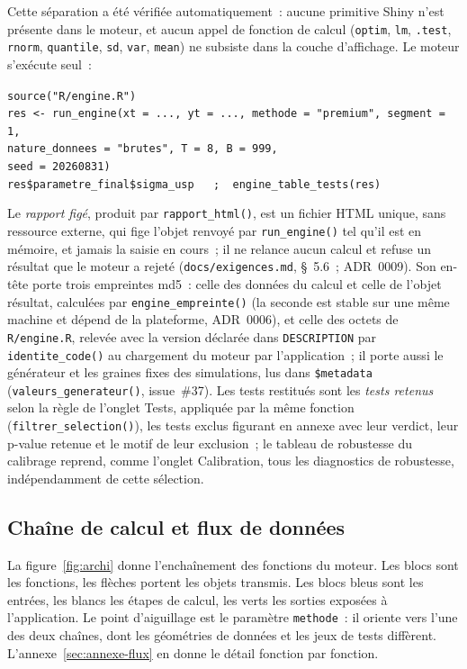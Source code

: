\documentclass[a4paper,11pt]{article}
\newcommand{\code}[1]{\texttt{\small #1}}
\begin{document}
\medskip
Cette séparation a été vérifiée automatiquement~: aucune primitive Shiny n'est
présente dans le moteur, et aucun appel de fonction de calcul
(\code{optim}, \code{lm}, \code{*.test}, \code{rnorm}, \code{quantile},
\code{sd}, \code{var}, \code{mean}) ne subsiste dans la couche d'affichage.
Le moteur s'exécute seul~:

\begin{encadre}
\small
\code{source("R/engine.R")}\\
\code{res <- run\_engine(xt = ..., yt = ..., methode = "premium", segment = 1,}\\
\code{\phantom{res <- run\_engine(}nature\_donnees = "brutes", T = 8, B = 999,}\\
\code{\phantom{res <- run\_engine(}seed = 20260831)}\\
\code{res\$parametre\_final\$sigma\_usp \ \ ;\ \ engine\_table\_tests(res)}
\end{encadre}

Le \emph{rapport figé}, produit par \code{rapport\_html()}, est un fichier HTML
unique, sans ressource externe, qui fige l'objet renvoyé par \code{run\_engine()}
tel qu'il est en mémoire, et jamais la saisie en cours~; il ne relance aucun
calcul et refuse un résultat que le moteur a rejeté (\code{docs/exigences.md},
§~5.6~; ADR~0009). Son en-tête porte trois empreintes md5~: celle des données du
calcul et celle de l'objet résultat, calculées par \code{engine\_empreinte()}
(la seconde est stable sur une même machine et dépend de la plateforme,
ADR~0006), et celle des octets de \code{R/engine.R}, relevée avec la version
déclarée dans \code{DESCRIPTION} par \code{identite\_code()} au chargement du
moteur par l'application~; il porte aussi le générateur et les graines fixes des simulations,
lus dans \code{\$metadata} (\code{valeurs\_generateur()}, issue~\#37). Les tests restitués sont les \emph{tests retenus}
selon la règle de l'onglet Tests, appliquée par la même fonction
(\code{filtrer\_selection()}), les tests exclus figurant en annexe avec leur
verdict, leur p-value retenue et le motif de leur exclusion~; le tableau de
robustesse du calibrage reprend, comme l'onglet Calibration, tous les
diagnostics de robustesse, indépendamment de cette sélection.

\subsection{Chaîne de calcul et flux de données}

La figure~\ref{fig:archi} donne l'enchaînement des fonctions du moteur. Les blocs
sont les fonctions, les flèches portent les objets transmis. Les blocs bleus sont
les entrées, les blancs les étapes de calcul, les verts les sorties exposées à
l'application. Le point d'aiguillage est le paramètre \code{methode}~: il oriente
vers l'une des deux chaînes, dont les géométries de données et les jeux de tests
diffèrent. L'annexe~\ref{sec:annexe-flux} en donne le détail fonction par
fonction.
\end{document}
